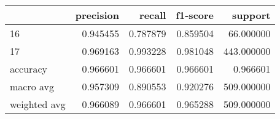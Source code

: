 \begin{tabular}{lrrrr}
\toprule
 & precision & recall & f1-score & support \\
\midrule
16 & 0.945455 & 0.787879 & 0.859504 & 66.000000 \\
17 & 0.969163 & 0.993228 & 0.981048 & 443.000000 \\
accuracy & 0.966601 & 0.966601 & 0.966601 & 0.966601 \\
macro avg & 0.957309 & 0.890553 & 0.920276 & 509.000000 \\
weighted avg & 0.966089 & 0.966601 & 0.965288 & 509.000000 \\
\bottomrule
\end{tabular}

